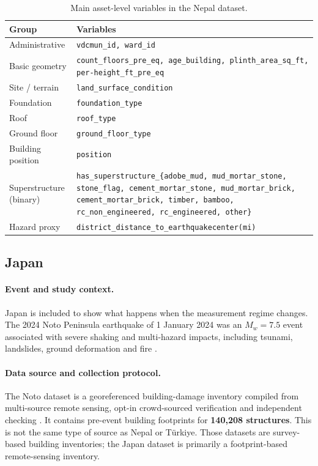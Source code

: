 \documentclass[11pt,a4paper]{article}
\begin{document}
\begin{table}[!t]
\centering
\caption{Main asset-level variables in the Nepal dataset.}
\label{tab:nepal-vars}
\small
\begin{tabularx}{\linewidth}{l X}
\toprule
\textbf{Group} & \textbf{Variables} \\
\midrule
Administrative & \texttt{vdcmun\_id, ward\_id} \\
Basic geometry & \texttt{count\_floors\_pre\_eq, age\_building,
plinth\_area\_sq\_ft, per-height\_ft\_pre\_eq} \\
Site / terrain & \texttt{land\_surface\_condition} \\
Foundation & \texttt{foundation\_type} \\
Roof & \texttt{roof\_type} \\
Ground floor & \texttt{ground\_floor\_type} \\
Building position & \texttt{position} \\
Superstructure (binary) &
\texttt{has\_superstructure\_\{adobe\_mud, mud\_mortar\_stone,
stone\_flag, cement\_mortar\_stone, mud\_mortar\_brick,
cement\_mortar\_brick, timber, bamboo, rc\_non\_engineered,
rc\_engineered, other\}} \\
Hazard proxy & \texttt{district\_distance\_to\_earthquakecenter(mi)} \\
\bottomrule
\end{tabularx}
\end{table}

\subsection{Japan}
\label{sec:data-japan}

\paragraph{Event and study context.} Japan is included to show what happens when the measurement regime changes. The 2024 Noto Peninsula earthquake of 1 January 2024 was an $M_w = 7.5$ event associated with severe shaking and multi-hazard impacts, including tsunami, landslides, ground deformation and fire \citep{vescovo2025noto,
usgs2024noto}.

\paragraph{Data source and collection protocol.} The Noto dataset is a georeferenced building-damage inventory compiled from multi-source remote sensing, opt-in crowd-sourced verification and independent checking \citep{vescovo2025noto}. It contains pre-event building footprints for \textbf{140{,}208 structures}. This is not the same type of source as Nepal or T\"urkiye. Those datasets are survey-based building inventories; the Japan dataset is primarily a footprint-based remote-sensing inventory.
\end{document}
